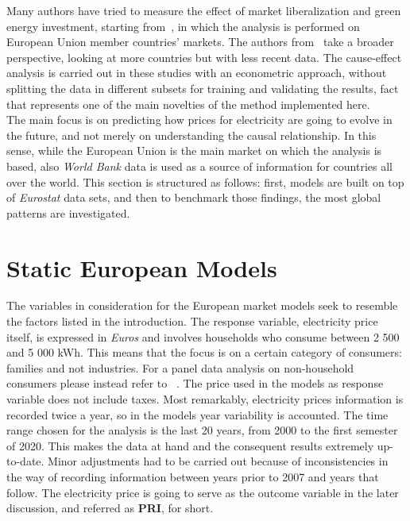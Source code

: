 \documentclass[a4paper,12pt]{book}
\begin{document}
Many authors have tried to measure the effect of market liberalization and green energy investment, starting from~\cite{moreno2012electricity}, in which the analysis  is performed on European Union member countries' markets. The authors from~\cite{nagayama2009electric} take a broader perspective, looking at more countries but with less recent data. The cause-effect analysis is carried out in these studies with an econometric approach, without splitting the data in different subsets for training and validating the results, fact that represents one of the main novelties of the method implemented here.\\

The main focus is on predicting how prices for electricity are going to evolve in the future, and not merely on understanding the causal relationship. In this sense, while the European Union is the main market on which the analysis is based, also \textit{World Bank} data is used as a source of information for countries all over the world. This section is structured as follows: first, models are built on top of \textit{Eurostat} data sets, and then to benchmark those findings, the most global patterns are investigated.

\section{Static European Models}

The variables in consideration for the European market models seek to resemble the factors listed in the introduction. The response variable, electricity price itself, is expressed in \textit{Euros} and involves households who consume between 2 500 and 5 000 kWh. This means that the focus is on a certain category of consumers: families and not industries. For a panel data analysis on non-household consumers please instead refer to ~\cite{del2019industrial}.  The price used in the models as response variable does not include taxes. Most remarkably, electricity prices information is recorded twice a year, so in the models year variability is accounted. The time range chosen for the analysis is the last 20 years, from 2000 to the first semester of 2020. This makes the data at hand and the consequent results extremely up-to-date. Minor adjustments had to be carried out because of inconsistencies in the way of recording information between years prior to 2007 and years that follow. The electricity price is going to serve as the outcome variable in the later discussion, and referred as \textbf{PRI}, for short.\\
\end{document}
